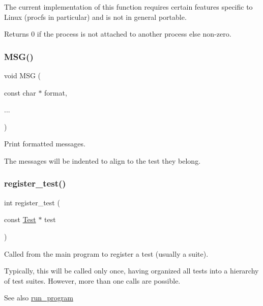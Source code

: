 The current implementation of this function requires certain features specific to Linux (procfs in particular) and is not in general portable.

\begin{DoxyReturn}{Returns}
0 if the process is not attached to another process else non-\/zero. 
\end{DoxyReturn}
\mbox{\label{group__Testing_ga2e36933a48fbca44bb782f881ddceb20}} 
\subsubsection{\texorpdfstring{M\+S\+G()}{MSG()}}
{\footnotesize\ttfamily void M\+SG (\begin{DoxyParamCaption}\item[{const char $\ast$}]{format,  }\item[{}]{... }\end{DoxyParamCaption})}



Print formatted messages. 

The messages will be indented to align to the test they belong. \mbox{\label{group__Testing_ga4663cf3fb390b2a6d9cf1943f21b9934}} 
\subsubsection{\texorpdfstring{register\+\_\+test()}{register\_test()}}
{\footnotesize\ttfamily int register\+\_\+test (\begin{DoxyParamCaption}\item[{const \hyperlink{structTest}{Test} $\ast$}]{test }\end{DoxyParamCaption})}



Called from the main program to register a test (usually a suite). 

Typically, this will be called only once, having organized all tests into a hierarchy of test suites. However, more than one calls are possible.

\begin{DoxySeeAlso}{See also}
\hyperlink{group__Testing_ga91dbdb97056588b088b689582abc2382}{run\+\_\+program} 
\end{DoxySeeAlso}
\mbox{\label{group__Testing_ga91dbdb97056588b088b689582abc2382}} 

